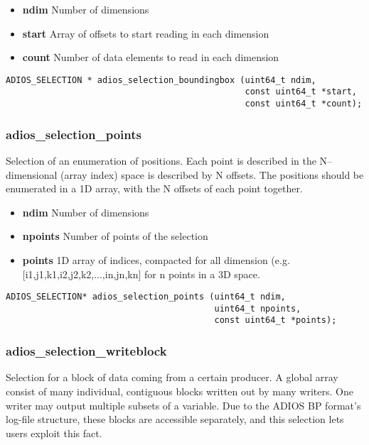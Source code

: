 \begin{itemize} 
\item{\bf ndim}      Number of dimensions
\item{\bf start}     Array of offsets to start reading in each dimension
\item{\bf count}     Number of data elements to read in each dimension
\end{itemize}

\begin{lstlisting}[alsolanguage=C]
ADIOS_SELECTION * adios_selection_boundingbox (uint64_t ndim, 
                                               const uint64_t *start, 
                                               const uint64_t *count);
\end{lstlisting}


\subsubsection{adios\_selection\_points}
Selection of an enumeration of positions.
Each point is described in the N--dimensional (array index) space is 
described by N offsets. The positions should be enumerated in a 1D array,
with the N offsets of each point together.

\begin{itemize} 
\item{\bf ndim}      Number of dimensions
\item{\bf npoints}   Number of points of the selection
\item{\bf points}    1D array of indices, compacted for all dimension
(e.g.  [i1,j1,k1,i2,j2,k2,...,in,jn,kn] for n points in a 3D space.
\end{itemize}

\begin{lstlisting}[alsolanguage=C]
ADIOS_SELECTION* adios_selection_points (uint64_t ndim, 
                                         uint64_t npoints, 
                                         const uint64_t *points);
\end{lstlisting}


\subsubsection{adios\_selection\_writeblock}
Selection for a block of data coming from a certain producer.
A global array consist of many individual, contiguous blocks written out by
many writers. One writer may output multiple subsets of a variable. 
Due to the ADIOS BP format's log-file structure, these blocks are accessible 
separately, and this selection lets users exploit this fact. 

